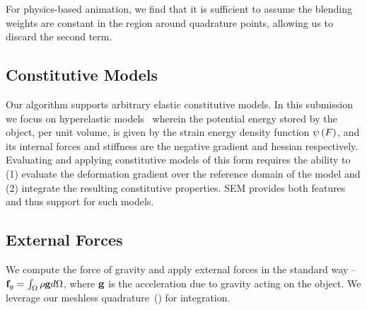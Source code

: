 For physics-based animation, we find that it is sufficient to assume the blending weights are constant in the region around quadrature points, allowing us to discard the second term.

\subsection{Constitutive Models}
Our algorithm supports arbitrary elastic constitutive models. 
In this submission we focus on hyperelastic models~\cite{10.1145/2343483.2343501} wherein the potential energy stored by the object, per unit volume,
is given by the strain energy density function $\psi\left(F\right)$, and its internal forces and stiffness are the negative gradient and hessian respectively. 
Evaluating and applying constitutive models of this form requires the ability to (1) evaluate the deformation gradient over the reference domain of the model and 
(2) integrate the resulting constitutive properties. 
SEM provides both features and thus support for such models.

\subsection{External Forces}
We compute the force of gravity and apply external forces in the standard way --
$\mathbf{f}_g = \int_{\Omega} \rho\mathbf{g} d\Omega$, where $\mathbf{g}$ is the acceleration due to gravity acting on the object. 
We leverage our meshless quadrature~() for integration.


